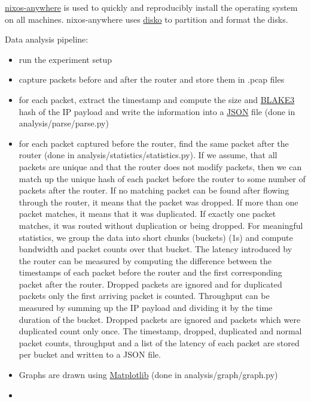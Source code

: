 \href{https://github.com/nix-community/nixos-anywhere}{nixos-anywhere} is used to quickly and reproducibly install the operating system on all machines.
nixos-anywhere uses \href{https://github.com/nix-community/disko}{disko} to partition and format the disks.



Data analysis pipeline:
\begin{itemize}
  \item run the experiment setup
  \item capture packets before and after the router and store them in .pcap files
  \item for each packet, extract the timestamp and compute the size and \href{https://en.wikipedia.org/wiki/BLAKE_(hash_function)#BLAKE3}{BLAKE3} hash of the IP payload and write the information into a \href{https://en.wikipedia.org/wiki/JSON}{JSON} file (done in analysis/parse/parse.py)
  \item for each packet captured before the router, find the same packet after the router (done in analysis/statistics/statistics.py). If we assume, that all packets are unique and that the router does not modify packets, then we can match up the unique hash of each packet before the router to some number of packets after the router. If no matching packet can be found after flowing through the router, it means that the packet was dropped. If more than one packet matches, it means that it was duplicated. If exactly one packet matches, it was routed without duplication or being dropped. For meaningful statistics, we group the data into short chunks (buckets) (1s) and compute bandwidth and packet counts over that bucket. The latency introduced by the router can be measured by computing the difference between the timestamps of each packet before the router and the first corresponding packet after the router. Dropped packets are ignored and for duplicated packets only the first arriving packet is counted. Throughput can be measured by summing up the IP payload  and dividing it by the time duration of the bucket. Dropped packets are ignored and packets which were duplicated count only once. The timestamp, dropped, duplicated and normal packet counts, throughput and a list of the latency of each packet are stored per bucket and written to a JSON file.
  \item Graphs are drawn using \href{https://matplotlib.org/}{Matplotlib} (done in analysis/graph/graph.py)
  \item {}
\end{itemize}


